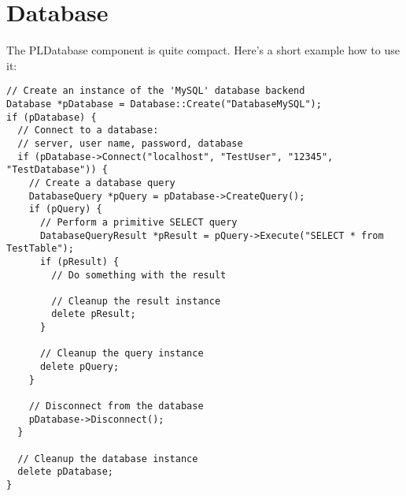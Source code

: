 \section{Database}
The PLDatabase component is quite compact. Here's a short example how to use it:

\begin{lstlisting}[caption=Using the PLDatabase component]
// Create an instance of the 'MySQL' database backend
Database *pDatabase = Database::Create("DatabaseMySQL");
if (pDatabase) {
  // Connect to a database:
  // server, user name, password, database
  if (pDatabase->Connect("localhost", "TestUser", "12345", "TestDatabase")) {
    // Create a database query
    DatabaseQuery *pQuery = pDatabase->CreateQuery();
    if (pQuery) {
      // Perform a primitive SELECT query
      DatabaseQueryResult *pResult = pQuery->Execute("SELECT * from TestTable");
      if (pResult) {
        // Do something with the result

        // Cleanup the result instance
        delete pResult;
      }

      // Cleanup the query instance
      delete pQuery;
    }

    // Disconnect from the database
    pDatabase->Disconnect();
  }

  // Cleanup the database instance
  delete pDatabase;
}
\end{lstlisting}

